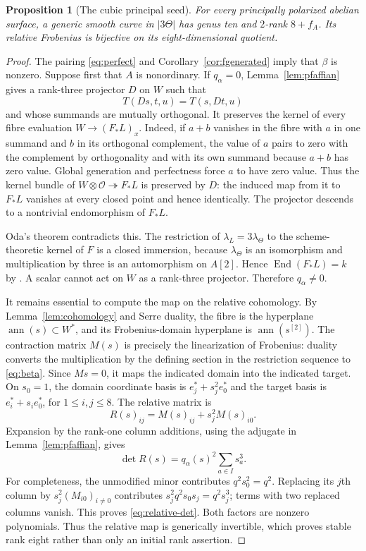\documentclass[11pt]{article}
\newtheorem{proposition}[theorem]{Proposition}
\theoremstyle{definition}\newtheorem{definition}[theorem]{Definition}
\theoremstyle{remark}\newtheorem{remark}[theorem]{Remark}
\newcommand{\OO}{\mathcal O}
\newcommand{\End}{\operatorname{End}}
\newcommand{\ann}{\operatorname{ann}}
\begin{document}
\begin{proposition}[The cubic principal seed]\label{prop:seed}
For every principally polarized abelian surface, a generic smooth curve in $|3\Theta|$ has genus ten and $2$-rank $8+f_A$. Its relative Frobenius is bijective on its eight-dimensional quotient.
\end{proposition}
\begin{proof}
The pairing \eqref{eq:perfect} and Corollary~\ref{cor:fgenerated} imply that $\beta$ is nonzero. Suppose first that $A$ is nonordinary. If $q_\alpha=0$, Lemma~\ref{lem:pfaffian} gives a rank-three projector $D$ on $W$ such that
\[
 T(Ds,t,u)=T(s,Dt,u)
\]
and whose summands are mutually orthogonal. It preserves the kernel of every fibre evaluation $W\to(F_*L)_x$. Indeed, if $a+b$ vanishes in the fibre with $a$ in one summand and $b$ in its orthogonal complement, the value of $a$ pairs to zero with the complement by orthogonality and with its own summand because $a+b$ has zero value. Global generation and perfectness force $a$ to have zero value. Thus the kernel bundle of $W\otimes\OO\twoheadrightarrow F_*L$ is preserved by $D$: the induced map from it to $F_*L$ vanishes at every closed point and hence identically. The projector descends to a nontrivial endomorphism of $F_*L$.

Oda's theorem contradicts this. The restriction of $\lambda_L=3\lambda_\Theta$ to the scheme-theoretic kernel of $F$ is a closed immersion, because $\lambda_\Theta$ is an isomorphism and multiplication by three is an automorphism on $A[2]$. Hence $\End(F_*L)=k$ by \citet[Theorem~1.2(i), p.~45; proof pp.~43--45]{Oda}. A scalar cannot act on $W$ as a rank-three projector. Therefore $q_\alpha\ne0$.

It remains essential to compute the map on the relative cohomology. By Lemma~\ref{lem:cohomology} and Serre duality, the fibre is the hyperplane $\ann(s)\subset W^*$, and its Frobenius-domain hyperplane is $\ann(s^{[2]})$. The contraction matrix $M(s)$ is precisely the linearization of Frobenius: duality converts the multiplication by the defining section in the restriction sequence to \eqref{eq:beta}. Since $Ms=0$, it maps the indicated domain into the indicated target. On $s_0=1$, the domain coordinate basis is $e_j^*+s_j^2e_0^*$ and the target basis is $e_i^*+s_ie_0^*$, for $1\le i,j\le8$. The relative matrix is
\[
 R(s)_{ij}=M(s)_{ij}+s_j^2M(s)_{i0}.
\]
Expansion by the rank-one column additions, using the adjugate in Lemma~\ref{lem:pfaffian}, gives
\begin{equation}\label{eq:relative-det}
 \det R(s)=q_\alpha(s)^2\sum_{a\in I}s_a^3.
\end{equation}
For completeness, the unmodified minor contributes $q^2s_0^2=q^2$. Replacing its $j$th column by $s_j^2(M_{i0})_{i\ne0}$ contributes $s_j^2q^2s_0s_j=q^2s_j^3$; terms with two replaced columns vanish. This proves \eqref{eq:relative-det}. Both factors are nonzero polynomials. Thus the relative map is generically invertible, which proves stable rank eight rather than only an initial rank assertion.


\end{proof}
\end{document}
